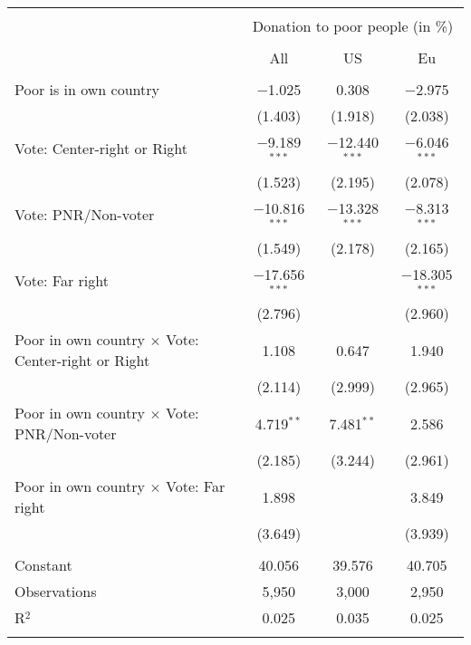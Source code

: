 
\begin{tabular}{@{\extracolsep{5pt}}lccc} 
\\[-1.8ex]\hline 
\hline \\[-1.8ex] 
 & \multicolumn{3}{c}{Donation to poor people (in \%)} \\ 
\cline{2-4} 
\\[-1.8ex] & All & US & Eu \\ 
\hline \\[-1.8ex] 
 Poor is in own country & $-$1.025 & 0.308 & $-$2.975 \\ 
  & (1.403) & (1.918) & (2.038) \\ 
  Vote: Center-right or Right & $-$9.189$^{***}$ & $-$12.440$^{***}$ & $-$6.046$^{***}$ \\ 
  & (1.523) & (2.195) & (2.078) \\ 
  Vote: PNR/Non-voter & $-$10.816$^{***}$ & $-$13.328$^{***}$ & $-$8.313$^{***}$ \\ 
  & (1.549) & (2.178) & (2.165) \\ 
  Vote: Far right & $-$17.656$^{***}$ &  & $-$18.305$^{***}$ \\ 
  & (2.796) &  & (2.960) \\ 
  Poor in own country $\times$ Vote: Center-right or Right & 1.108 & 0.647 & 1.940 \\ 
  & (2.114) & (2.999) & (2.965) \\ 
  Poor in own country $\times$ Vote: PNR/Non-voter & 4.719$^{**}$ & 7.481$^{**}$ & 2.586 \\ 
  & (2.185) & (3.244) & (2.961) \\ 
  Poor in own country $\times$ Vote: Far right & 1.898 &  & 3.849 \\ 
  & (3.649) &  & (3.939) \\ 
 \hline \\[-1.8ex] 
Constant & 40.056 & 39.576 & 40.705 \\ 
Observations & 5,950 & 3,000 & 2,950 \\ 
R$^{2}$ & 0.025 & 0.035 & 0.025 \\ 
\hline 
\hline \\[-1.8ex] 
\end{tabular} 